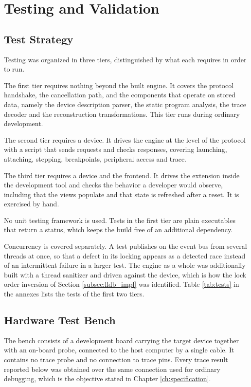\section{Testing and Validation}
\label{sec:testing}

\subsection{Test Strategy}
Testing was organized in three tiers, distinguished by what each requires in order to run.

The first tier requires nothing beyond the built engine. It covers the protocol handshake, the cancellation path, and the components that operate on stored data, namely the device description parser, the static program analysis, the trace decoder and the reconstruction transformations. This tier runs during ordinary development.

The second tier requires a device. It drives the engine at the level of the protocol with a script that sends requests and checks responses, covering launching, attaching, stepping, breakpoints, peripheral access and trace.

The third tier requires a device and the frontend. It drives the extension inside the development tool and checks the behavior a developer would observe, including that the views populate and that state is refreshed after a reset. It is exercised by hand.

No unit testing framework is used. Tests in the first tier are plain executables that return a status, which keeps the build free of an additional dependency.

Concurrency is covered separately. A test publishes on the event bus from several threads at once, so that a defect in its locking appears as a detected race instead of an intermittent failure in a larger test. The engine as a whole was additionally built with a thread sanitizer and driven against the device, which is how the lock order inversion of Section \ref{subsec:lldb_impl} was identified. Table \ref{tab:tests} in the annexes lists the tests of the first two tiers.

\subsection{Hardware Test Bench}
\label{subsec:bench}
The bench consists of a development board carrying the target device together with an on-board probe, connected to the host computer by a single cable. It contains no trace probe and no connection to trace pins. Every trace result reported below was obtained over the same connection used for ordinary debugging, which is the objective stated in Chapter \ref{ch:specification}.

